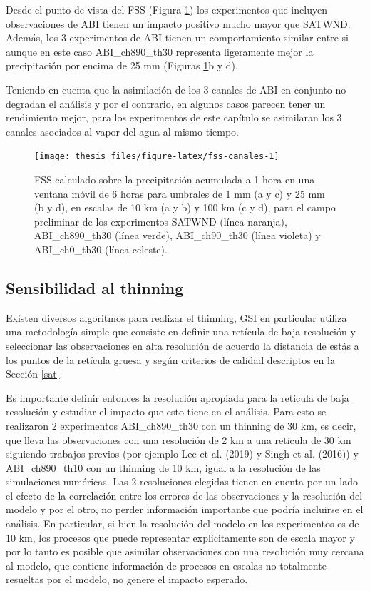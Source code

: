 \documentclass[12pt,oneside,a4paper]{reedthesis}
\begin{document}
Desde el punto de vista del FSS (Figura \ref{fig:fss-canales}) los experimentos que incluyen observaciones de ABI tienen un impacto positivo mucho mayor que SATWND. Además, los 3 experimentos de ABI tienen un comportamiento similar entre si aunque en este caso ABI\_ch890\_th30 representa ligeramente mejor la precipitación por encima de 25 mm (Figuras \ref{fig:fss-canales}b y d).

Teniendo en cuenta que la asimilación de los 3 canales de ABI en conjunto no degradan el análisis y por el contrario, en algunos casos parecen tener un rendimiento mejor, para los experimentos de este capítulo se asimilaran los 3 canales asociados al vapor del agua al mismo tiempo.


\begin{figure}
\texttt{[image: thesis\_files/figure-latex/fss-canales-1]} \caption{FSS calculado sobre la precipitación acumulada a 1 hora en una ventana móvil de 6 horas para umbrales de 1 mm (a y c) y 25 mm (b y d), en escalas de 10 km (a y b) y 100 km (c y d), para el campo preliminar de los experimentos SATWND (línea naranja), ABI\_ch890\_th30 (línea verde), ABI\_ch90\_th30 (línea violeta) y ABI\_ch0\_th30 (línea celeste).}\label{fig:fss-canales}
\end{figure}
\hypertarget{thinning}{%
\subsection{Sensibilidad al thinning}\label{thinning}}

Existen diversos algoritmos para realizar el thinning, GSI en particular utiliza una metodología simple que consiste en definir una retícula de baja resolución y seleccionar las observaciones en alta resolución de acuerdo la distancia de estás a los puntos de la retícula gruesa y según criterios de calidad descriptos en la Sección \ref{sat}.

Es importante definir entonces la resolución apropiada para la reticula de baja resolución y estudiar el impacto que esto tiene en el análisis. Para esto se realizaron 2 experimentos ABI\_ch890\_th30 con un thinning de 30 km, es decir, que lleva las observaciones con una resolución de 2 km a una reticula de 30 km siguiendo trabajos previos (por ejemplo Lee et al. (2019) y Singh et al. (2016)) y ABI\_ch890\_th10 con un thinning de 10 km, igual a la resolución de las simulaciones numéricas. Las 2 resoluciones elegidas tienen en cuenta por un lado el efecto de la correlación entre los errores de las observaciones y la resolución del modelo y por el otro, no perder información importante que podría incluirse en el análisis. En particular, si bien la resolución del modelo en los experimentos es de 10 km, los procesos que puede representar explicitamente son de escala mayor y por lo tanto es posible que asimilar observaciones con una resolución muy cercana al modelo, que contiene información de procesos en escalas no totalmente resueltas por el modelo, no genere el impacto esperado.
\end{document}
